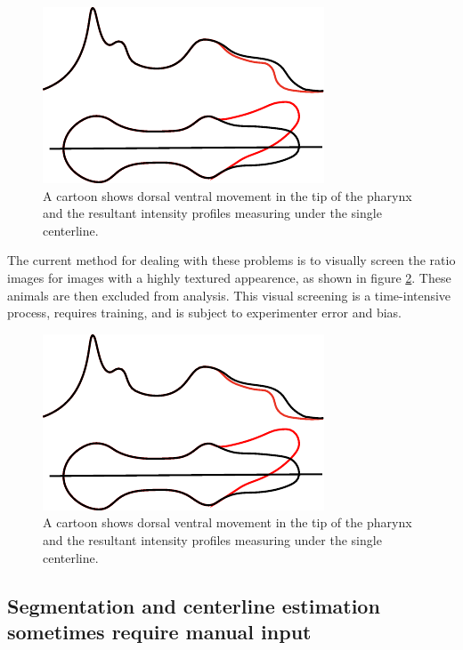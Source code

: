 \begin{figure}[ht]
    \centering
    \includegraphics{Figures/rendered_files/dorsalventral_cartoon}
    \decoRule
    \caption[Dorsal ventral movement of the tip of a pharynx]{A cartoon shows dorsal ventral movement in the tip of the pharynx and the resultant intensity profiles measuring under the single centerline.}
    \label{fig:DorsalVentralCartoon}
\end{figure}

The current method for dealing with these problems is to visually screen the ratio images for images with a highly textured appearence, as shown in figure \ref{fig:HighMovement}. These animals are then excluded from analysis. This visual screening is a time-intensive process, requires training, and is subject to experimenter error and bias.

\begin{figure}[ht]
    \centering
    \includegraphics{Figures/rendered_files/dorsalventral_cartoon}
    \decoRule
    \caption[Dorsal ventral movement of the tip of a pharynx]{A cartoon shows dorsal ventral movement in the tip of the pharynx and the resultant intensity profiles measuring under the single centerline.}
    \label{fig:HighMovement}
\end{figure}

\subsection{Segmentation and centerline estimation sometimes require manual input}\label{limitationManual}

